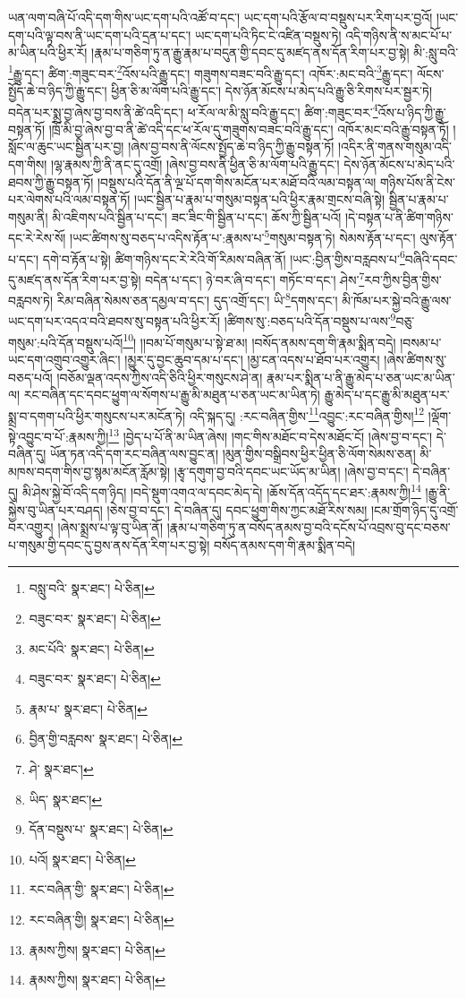 ཡན་ལག་བཞི་པོ་འདི་དག་གིས་ཡང་དག་པའི་འཚོ་བ་དང་། ཡང་དག་པའི་རྩོལ་བ་བསྡུས་པར་རིག་པར་བྱའོ། །ཡང་དག་པའི་ལྟ་བས་ནི་ཡང་དག་པའི་དྲན་པ་དང་། ཡང་དག་པའི་ཏིང་ངེ་འཛིན་བསྡུས་ཏེ། འདི་གཉིས་ནི་ས་མང་པོ་པ་མ་ཡིན་པའི་ཕྱིར་རོ། །རྣམ་པ་གཅིག་ཏུ་ན་རྒྱུ་རྣམ་པ་བདུན་གྱི་དབང་དུ་མཛད་ནས་དོན་རིག་པར་བྱ་སྟེ། མི་:སླུ་བའི་\footnote{བསླུ་བའི་  སྣར་ཐང་།  པེ་ཅིན། }རྒྱུ་དང་། ཚིག་:གཟུང་བར་\footnote{བཟུང་བར་  སྣར་ཐང་།  པེ་ཅིན། }འོས་པའི་རྒྱུ་དང་། གཟུགས་བཟང་བའི་རྒྱུ་དང་། འཁོར་:མང་བའི་\footnote{མང་པོའི་  སྣར་ཐང་།  པེ་ཅིན། }རྒྱུ་དང་། ལོངས་སྤྱོད་ཆེ་བ་ཉིད་ཀྱི་རྒྱུ་དང་། ཕྱིན་ཅི་མ་ལོག་པའི་རྒྱུ་དང་། དེས་ཉོན་མོངས་པ་མེད་པའི་རྒྱུ་ཅི་རིགས་པར་སྦྱར་ཏེ། བདེན་པར་སྨྲ་བྱ་ཞེས་བྱ་བས་ནི་ཚེ་འདི་དང་། ཕ་རོལ་ལ་མི་སླུ་བའི་རྒྱུ་དང་། ཚིག་:གཟུང་བར་\footnote{བཟུང་བར་  སྣར་ཐང་།  པེ་ཅིན། }འོས་པ་ཉིད་ཀྱི་རྒྱུ་བསྟན་ཏོ། །ཁྲོ་མི་བྱ་ཞེས་བྱ་བ་ནི་ཚེ་འདི་དང་ཕ་རོལ་དུ་གཟུགས་བཟང་བའི་རྒྱུ་དང་། འཁོར་མང་བའི་རྒྱུ་བསྟན་ཏོ། །སློང་ལ་ཆུང་ཡང་སྦྱིན་པར་བྱ། །ཞེས་བྱ་བས་ནི་ལོངས་སྤྱོད་ཆེ་བ་ཉིད་ཀྱི་རྒྱུ་བསྟན་ཏོ། །འདིར་ནི་གནས་གསུམ་འདི་དག་གིས། །ལྷ་རྣམས་ཀྱི་ནི་ནང་དུ་འགྲོ། །ཞེས་བྱ་བས་ནི་ཕྱིན་ཅི་མ་ལོག་པའི་རྒྱུ་དང་། དེས་ཉོན་མོངས་པ་མེད་པའི་ཐབས་ཀྱི་རྒྱུ་བསྟན་ཏོ། །བསྡུས་པའི་དོན་ནི་ལྔ་པོ་དག་གིས་མངོན་པར་མཐོ་བའི་ལམ་བསྟན་ལ། གཉིས་པོས་ནི་ངེས་པར་ལེགས་པའི་ལམ་བསྟན་ཏོ། །ཡང་སྦྱིན་པ་རྣམ་པ་གསུམ་བསྟན་པའི་ཕྱིར་རྣམ་གྲངས་བཞི་སྟེ། སྦྱིན་པ་རྣམ་པ་གསུམ་ནི། མི་འཇིགས་པའི་སྦྱིན་པ་དང་། ཟང་ཟིང་གི་སྦྱིན་པ་དང་། ཆོས་ཀྱི་སྦྱིན་པའོ། །དེ་བསྟན་པ་ནི་ཚིག་གཉིས་དང་རེ་རེས་སོ། །ཡང་ཚིགས་སུ་བཅད་པ་འདིས་རྟོན་པ་:རྣམས་པ་\footnote{རྣམ་པ་  སྣར་ཐང་།  པེ་ཅིན། }གསུམ་བསྟན་ཏེ། སེམས་རྟོན་པ་དང་། ལུས་རྟོན་པ་དང་། དགེ་བ་རྟོན་པ་སྟེ། ཚིག་གཉིས་དང་རེ་རེའི་གོ་རིམས་བཞིན་ནོ། །ཡང་:བྱིན་གྱིས་བརླབས་པ་\footnote{བྱིན་གྱི་བརླབས་  སྣར་ཐང་།  པེ་ཅིན། }བཞིའི་དབང་དུ་མཛད་ནས་དོན་རིག་པར་བྱ་སྟེ། བདེན་པ་དང་། ཉེ་བར་ཞི་བ་དང་། གཏོང་བ་དང་། ཤེས་\footnote{ཤེ་  སྣར་ཐང་། }རབ་ཀྱིས་བྱིན་གྱིས་བརླབས་ཏེ། རིམ་བཞིན་སེམས་ཅན་དམྱལ་བ་དང་། དུད་འགྲོ་དང་། ཡི་\footnote{ཡིད་  སྣར་ཐང་། }དགས་དང་། མི་ཁོམ་པར་སྐྱེ་བའི་རྒྱུ་ལས་ཡང་དག་པར་འདའ་བའི་ཐབས་སུ་བསྟན་པའི་ཕྱིར་རོ། །ཚིགས་སུ་:བཅད་པའི་དོན་བསྡུས་པ་ལས་\footnote{དོན་བསྡུས་པ་  སྣར་ཐང་།  པེ་ཅིན། }བཅུ་གསུམ་:པའི་དོན་བསྡུས་པའོ།\footnote{པའོ།  སྣར་ཐང་།  པེ་ཅིན། }། །།བམ་པོ་གསུམ་པ་སྟེ་ཐ་མ། །བསོད་ནམས་དག་གི་རྣམ་སྨིན་བདེ། །བསམ་པ་ཡང་དག་འགྲུབ་འགྱུར་ཞིང་། །མྱུར་དུ་བྱང་ཆུབ་དམ་པ་དང་། །མྱ་ངན་འདས་པ་ཐོབ་པར་འགྱུར། །ཞེས་ཚིགས་སུ་བཅད་པའོ། །བཅོམ་ལྡན་འདས་ཀྱིས་འདི་ཅིའི་ཕྱིར་གསུངས་ཤེ་ན། རྣམ་པར་སྨིན་པ་ནི་རྒྱུ་མེད་པ་ཅན་ཡང་མ་ཡིན་ལ། རང་བཞིན་དང་དབང་ཕྱུག་ལ་སོགས་པ་རྒྱུ་མི་མཐུན་པ་ཅན་ཡང་མ་ཡིན་ཏེ། རྒྱུ་མེད་པ་དང་རྒྱུ་མི་མཐུན་པར་སྨྲ་བ་དགག་པའི་ཕྱིར་གསུངས་པར་མངོན་ཏེ། འདི་སྐད་དུ། :རང་བཞིན་གྱིས་\footnote{རང་བཞིན་གྱི་  སྣར་ཐང་།  པེ་ཅིན། }འབྱུང་:རང་བཞིན་གྱིས།\footnote{རང་བཞིན་གྱི།  སྣར་ཐང་།  པེ་ཅིན། } །ལྡོག་སྟེ་འབྱུང་བ་པོ་:རྣམས་ཀྱི།\footnote{རྣམས་ཀྱིས།  སྣར་ཐང་།  པེ་ཅིན། } །བྱེད་པ་པོ་ནི་མ་ཡིན་ཞེས། །གང་གིས་མཐོང་བ་དེས་མཐོང་ངོ། །ཞེས་བྱ་བ་དང་། དེ་བཞིན་དུ། ཡོན་ཏན་འདི་དག་རང་བཞིན་ལས་བྱུང་ན། །མུན་གྱིས་བསྒྲིབས་ཕྱིར་ཕྱིན་ཅི་ལོག་སེམས་ཅན། མི་མཁས་བདག་གིས་བྱ་སྙམ་མངོན་རློམ་སྟེ། །རྩྭ་དགུག་བྱ་བའི་དབང་ཡང་ཡོད་མ་ཡིན། །ཞེས་བྱ་བ་དང་། དེ་བཞིན་དུ། མི་ཤེས་སྐྱེ་བོ་འདི་དག་ཉིད། །བདེ་སྡུག་འགའ་ལ་དབང་མེད་དེ། །ཆོས་དོན་འདོད་དང་ཐར་:རྣམས་ཀྱི།\footnote{རྣམས་ཀྱིས།  སྣར་ཐང་།  པེ་ཅིན། } །རྒྱུ་ནི་སྐྱེས་བུ་ཡིན་པར་བཤད། །ཅེས་བྱ་བ་དང་། དེ་བཞིན་དུ། དབང་ཕྱུག་གིས་ཀྱང་མཐོ་རིས་སམ། །ངམ་གྲོག་ཉིད་དུ་འགྲོ་བར་འགྱུར། །ཞེས་སྨྲས་པ་ལྟ་བུ་ཡིན་ནོ། །རྣམ་པ་གཅིག་ཏུ་ན་བསོད་ནམས་བྱ་བའི་དངོས་པོ་འབྲས་བུ་དང་བཅས་པ་གསུམ་གྱི་དབང་དུ་བྱས་ནས་དོན་རིག་པར་བྱ་སྟེ། བསོད་ནམས་དག་གི་རྣམ་སྨིན་བདེ། 